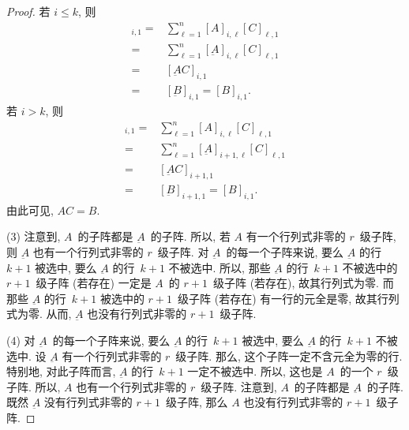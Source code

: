 \begin{proof}
    若 \(i \leq k\), 则
    \begin{align*}
        [AC]_{i,1}
        = {} &
        \sum_{\ell = 1}^{n}
        {[A]_{i,\ell} [C]_{\ell,1}}
        \\
        = {} &
        \sum_{\ell = 1}^{n}
        {[\underbar{A}]_{i,\ell} [C]_{\ell,1}}
        \\
        = {} & [\underbar{A}C]_{i,1}
        \\
        = {} & [\underbar{B}]_{i,1}
            =
            [B]_{i,1}.
    \end{align*}
    若 \(i > k\), 则
    \begin{align*}
        [AC]_{i,1}
        = {} &
        \sum_{\ell = 1}^{n}
        {[A]_{i,\ell} [C]_{\ell,1}}
        \\
        = {} &
        \sum_{\ell = 1}^{n}
        {[\underbar{A}]_{i+1,\ell} [C]_{\ell,1}}
        \\
        = {} & [\underbar{A}C]_{i+1,1}
        \\
        = {} & [\underbar{B}]_{i+1,1}
            =
            [B]_{i,1}.
    \end{align*}
    由此可见, \(AC = B\).

    (3)
    注意到, \(A\)~的子阵都是 \(\underbar{A}\)~的子阵.
    所以, 若 \(A\) 有一个行列式非零的 \(r\)~级子阵,
    则 \(\underbar{A}\) 也有一个行列式非零的 \(r\)~级子阵.
    对 \(\underbar{A}\)~的每一个子阵来说,
    要么 \(\underbar{A}\) 的行~\(k+1\) 被选中,
    要么 \(\underbar{A}\) 的行~\(k+1\) 不被选中.
    所以, 那些 \(\underbar{A}\) 的行~\(k+1\) 不被选中的
    \(r+1\)~级子阵 (若存在)
    一定是 \(A\)~的 \(r+1\)~级子阵 (若存在),
    故其行列式为零.
    而那些 \(\underbar{A}\) 的行~\(k+1\) 被选中的
    \(r+1\)~级子阵 (若存在)
    有一行的元全是零,
    故其行列式为零.
    从而, \(\underbar{A}\) 也没有行列式非零的 \(r+1\)~级子阵.

    (4)
    对 \(\underbar{A}\)~的每一个子阵来说,
    要么 \(\underbar{A}\) 的行~\(k+1\) 被选中,
    要么 \(\underbar{A}\) 的行~\(k+1\) 不被选中.
    设 \(\underbar{A}\) 有一个行列式非零的 \(r\)~级子阵.
    那么, 这个子阵一定不含元全为零的行.
    特别地, 对此子阵而言,
    \(\underbar{A}\) 的行~\(k+1\) 一定不被选中.
    所以, 这也是 \(A\)~的一个 \(r\)~级子阵.
    所以, \(A\) 也有一个行列式非零的 \(r\)~级子阵.
    注意到, \(A\)~的子阵都是 \(\underbar{A}\)~的子阵.
    既然 \(\underbar{A}\) 没有行列式非零的 \(r+1\)~级子阵,
    那么 \(A\) 也没有行列式非零的 \(r+1\)~级子阵.
\end{proof}

